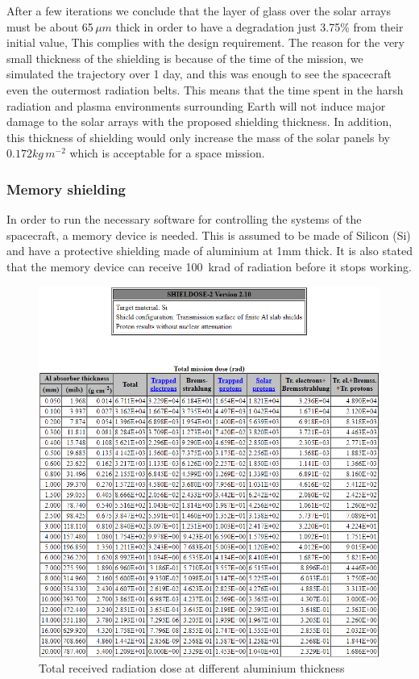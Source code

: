 After a few iterations we conclude that the layer of glass over the solar arrays must be about 65\,$\mu m$ thick in order to have a degradation just 3.75\% from their initial value, This complies with the design requirement. The reason for the very small thickness of the shielding is because of the time of the mission, we simulated the trajectory over 1 day, and this was enough to see the spacecraft even the outermost radiation belts. This means that the time spent in the harsh radiation and plasma environments surrounding Earth will not induce major damage to the solar arrays with the proposed shielding thickness. In addition, this thickness of shielding would only increase the mass of the solar panels by $0.172 kg\,m^{-2} $ which is acceptable for a space mission.

\newpage
\subsubsection{Memory shielding}

In order to run the necessary software for controlling the systems of the spacecraft, a memory device is needed. This is assumed to be made of Silicon (Si) and have a protective shielding made of aluminium at 1mm thick. It is also stated that the memory device can receive 100\, krad of radiation before it stops working. 

\begin{figure}[H]
\centering
\includegraphics[width=1\textwidth]{figures/SiShielding.png}
\caption{Total received radiation dose at different aluminium thickness}
\label{SiShielding}
\end{figure}

